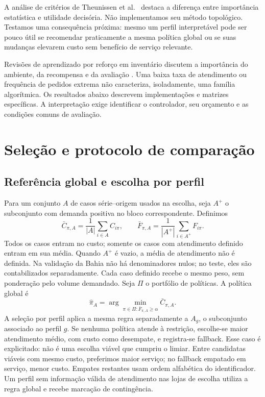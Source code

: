 \documentclass[preprint,12pt]{elsarticle}
\begin{document}
A análise de critérios de Theunissen et al.\ \cite{sca_c5c06dcbc9e5} destaca a diferença entre importância estatística e utilidade decisória. Não implementamos seu método topológico. Testamos uma consequência próxima: mesmo um perfil interpretável pode ser pouco útil se recomendar praticamente a mesma política global ou se suas mudanças elevarem custo sem benefício de serviço relevante.

Revisões de aprendizado por reforço em inventário discutem a importância do ambiente, da recompensa e da avaliação \cite{Boute2022DRLInventoryRoadmap}. Uma baixa taxa de atendimento ou frequência de pedidos extrema não caracteriza, isoladamente, uma família algorítmica. Os resultados abaixo descrevem implementações e matrizes específicas. A interpretação exige identificar o controlador, seu orçamento e as condições comuns de avaliação.



\section{Seleção e protocolo de comparação}
\subsection{Referência global e escolha por perfil}
Para um conjunto $A$ de casos série--origem usados na escolha, seja $A^+$ o subconjunto com demanda positiva no bloco correspondente. Definimos
\begin{equation}
 \bar C_{\pi,A}=\frac{1}{|A|}\sum_{i\in A}C_{i\pi},\qquad
 \bar F_{\pi,A}=\frac{1}{|A^+|}\sum_{i\in A^+}F_{i\pi}.
\end{equation}
Todos os casos entram no custo; somente os casos com atendimento definido entram em sua média. Quando $A^+$ é vazio, a média de atendimento não é definida. Na validação da Bahia não há denominadores nulos; no teste, eles são contabilizados separadamente. Cada caso definido recebe o mesmo peso, sem ponderação pelo volume demandado. Seja $\Pi$ o portfólio de políticas. A política global é
\begin{equation}
 \widehat\pi_A=\arg\min_{\pi\in\Pi:\bar F_{\pi,A}\geq\alpha}\bar C_{\pi,A}.
\end{equation}
A seleção por perfil aplica a mesma regra separadamente a $A_g$, o subconjunto associado ao perfil $g$. Se nenhuma política atende à restrição, escolhe-se maior atendimento médio, com custo como desempate, e registra-se fallback. Esse caso é explicitado: não é uma escolha viável que cumpriu o limiar. Entre candidatas viáveis com mesmo custo, preferimos maior serviço; no fallback empatado em serviço, menor custo. Empates restantes usam ordem alfabética do identificador. Um perfil sem informação válida de atendimento nas lojas de escolha utiliza a regra global e recebe marcação de contingência.
\end{document}
